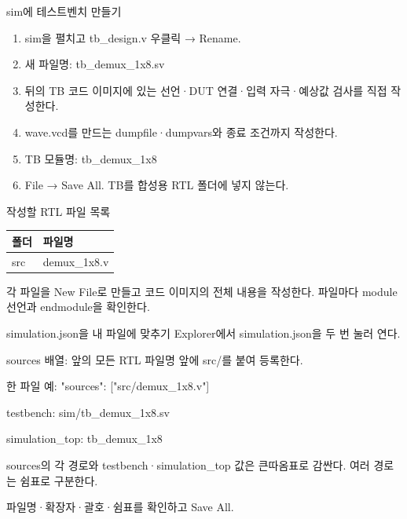 \begin{frame}{sim에 테스트벤치 만들기}\relax
\small
\begin{enumerate}\setlength{\itemsep}{0.22cm}
\item sim을 펼치고 tb\_design.v 우클릭 → Rename.
\item 새 파일명: tb\_demux\_1x8.sv
\item 뒤의 TB 코드 이미지에 있는 선언·DUT 연결·입력 자극·예상값 검사를 직접 작성한다.
\item wave.vcd를 만드는 dumpfile·dumpvars와 종료 조건까지 작성한다.
\item TB 모듈명: tb\_demux\_1x8
\item File → Save All. TB를 합성용 RTL 폴더에 넣지 않는다.
\end{enumerate}

\end{frame}

\begin{frame}{작성할 RTL 파일 목록}\relax
\small
\begin{center}\renewcommand{\arraystretch}{1.45}
\begin{tabular}{l|l}
폴더 & 파일명\\\hline
src & demux\_1x8.v\\
\end{tabular}\end{center}
각 파일을 New File로 만들고 코드 이미지의 전체 내용을 작성한다. 파일마다 module 선언과 endmodule을 확인한다.\par
\end{frame}

\begin{frame}{simulation.json을 내 파일에 맞추기}\relax
\small
Explorer에서 simulation.json을 두 번 눌러 연다.\par\vspace{0.22cm}sources 배열: 앞의 모든 RTL 파일명 앞에 src/를 붙여 등록한다.\par\vspace{0.22cm}한 파일 예: "sources": ["src/demux\_1x8.v"]\par\vspace{0.22cm}testbench: sim/tb\_demux\_1x8.sv\par\vspace{0.22cm}simulation\_top: tb\_demux\_1x8\par\vspace{0.22cm}sources의 각 경로와 testbench·simulation\_top 값은 큰따옴표로 감싼다. 여러 경로는 쉼표로 구분한다.\par\vspace{0.22cm}파일명·확장자·괄호·쉼표를 확인하고 Save All.\par
\end{frame}

